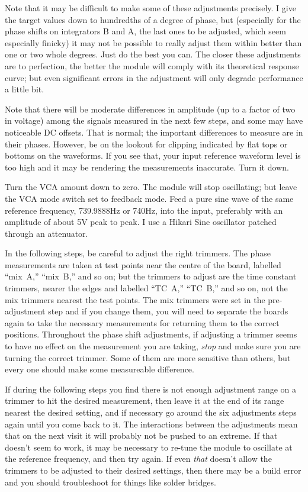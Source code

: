 Note that it may be difficult to make some of these adjustments precisely. 
I give the target values down to hundredths of a degree of phase, but
(especially for the phase shifts on integrators B and A, the last ones to be
adjusted, which seem especially finicky) it may not be possible to really
adjust them within better than one or two whole degrees.  Just do the best
you can.  The closer these adjustments are to perfection, the better the
module will comply with its theoretical response curve; but even significant
errors in the adjustment will only degrade performance a little bit.

Note that there will be moderate differences in amplitude (up to a factor of
two in voltage) among the signals measured in the next few steps, and some
may have noticeable DC offsets.  That is normal; the important differences
to measure are in their phases.  However, be on the lookout for clipping
indicated by flat tops or bottoms on the waveforms.  If you see that,
your input reference waveform level is too high and it may be rendering the
measurements inaccurate.  Turn it down.

Turn the VCA amount down to zero.  The module will stop oscillating; but
leave the VCA mode switch set to feedback mode.  Feed a pure sine wave of
the same reference frequency, 739.9888Hz or 740Hz, into the input,
preferably with an amplitude of about 5V peak to peak.  I use a Hikari Sine
oscillator patched through an attenuator.

In the following steps, be careful to adjust the right trimmers.  The phase
measurements are taken at test points near the centre of the board, labelled
``mix~A,'' ``mix~B,'' and so on; but the trimmers to adjust are the time
constant trimmers, nearer the edges and labelled ``TC~A,'' ``TC~B,'' and so
on, not the mix trimmers nearest the test points.  The mix trimmers were set
in the pre-adjustment step and if you change them, you will need to separate
the boards again to take the necessary measurements for returning them to
the correct positions.  Throughout the phase shift adjustments, if adjusting
a trimmer seems to have no effect on the measurement you are taking,
\emph{stop} and make sure you are turning the correct trimmer.  Some of them
are more sensitive than others, but every one should make some measureable
difference.

If during the following steps you find there is not enough adjustment range
on a trimmer to hit the desired measurement, then leave it at the end of its
range nearest the desired setting, and if necessary go around the six
adjustments steps again until you come back to it.  The interactions between
the adjustments mean that on the next visit it will probably not be pushed
to an extreme.  If that doesn't seem to work, it may be necessary to re-tune
the module to oscillate at the reference frequency, and then try again.  If
even \emph{that} doesn't allow the trimmers to be adjusted to their desired
settings, then there may be a build error and you should troubleshoot for
things like solder bridges.

